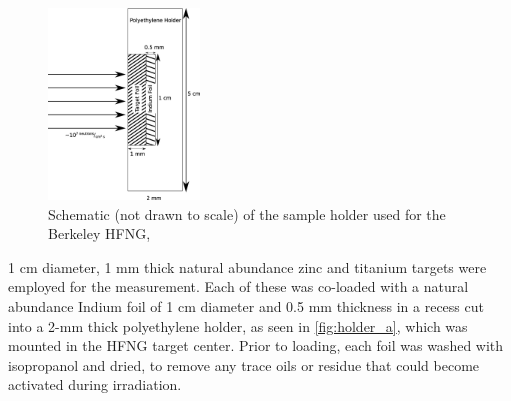 \documentclass[5p]{elsarticle}
\begin{document}
\begin{figure}
    \centering
        \includegraphics[height=2in]{./figures/holder.pdf}
        \caption{Schematic (not drawn to scale) of the sample holder used for the Berkeley HFNG,}
        \label{fig:holder_a}
\end{figure}


1 cm diameter, 1 mm thick natural abundance zinc and titanium targets were employed for the measurement. Each of these was  co-loaded with a natural abundance Indium foil of 1 cm diameter and 0.5 mm thickness in a recess cut into a 2-mm thick polyethylene holder, as seen in \autoref{fig:holder_a}, which was mounted in the HFNG target center. Prior to loading, each foil was washed with isopropanol and dried, to remove any trace oils or residue that could become activated during irradiation. 
\end{document}
